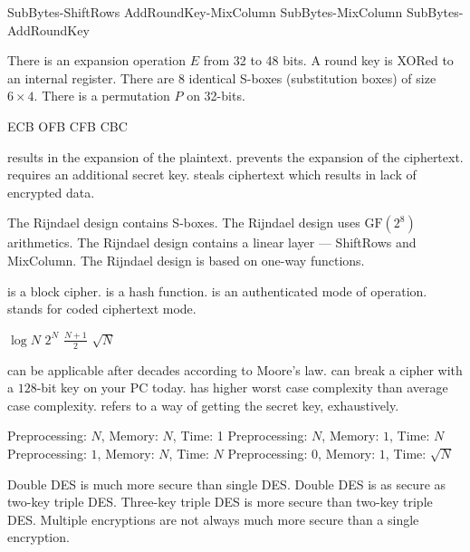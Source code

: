  {SubBytes-ShiftRows}
 {AddRoundKey-MixColumn}
 {SubBytes-MixColumn}
 {SubBytes-AddRoundKey}
 
 {There is an expansion operation $E$ from 32 to 48 bits.}
{A round key is XORed to an internal register.}
{There are $8$ identical S-boxes (substitution boxes) of size $6 \times 4$.}
 {There is a permutation $P$ on 32-bits.}
 
 {ECB}
 {OFB}
 {CFB}
 {CBC}
 
 
 {results in the expansion  of the plaintext.}
 {prevents the expansion of the ciphertext.}
 {requires an additional secret key.}
 {steals ciphertext which results in lack of encrypted data.}
 
 {The Rijndael design contains S-boxes.}
 {The Rijndael design uses $\text{GF}(2^8)$ arithmetics.}
 {The Rijndael design contains a linear layer --- ShiftRows and MixColumn.}
 {The Rijndael design is based on one-way functions.}
 
{is a block cipher.}
{is a hash function.}
{is an authenticated mode of operation.}
{stands for coded ciphertext mode.}
	
 {$\log N$}
 {$2^N$}
 {$\frac{N+1}{2}$}
 {$\sqrt{N}$}
 
 {can be applicable after decades according to Moore's law.}
 {can break a cipher with a $128$-bit key on your PC today.}
 {has higher worst case complexity than average case complexity.}
 {refers to a way of getting the secret key, exhaustively.}

{Preprocessing: $N$, Memory: $N$, Time: 1 }
{Preprocessing: $N$, Memory: $1$, Time: $N$ }
{Preprocessing: $1$, Memory: $N$, Time: $N$ }
{Preprocessing: $0$, Memory: $1$, Time: $\sqrt{N}$ }

{Double DES is much more secure than single DES.}
{Double DES is as secure as two-key triple DES.}
{Three-key triple DES is more secure than two-key triple DES.}
{Multiple encryptions are not always much more secure than a single encryption.}

